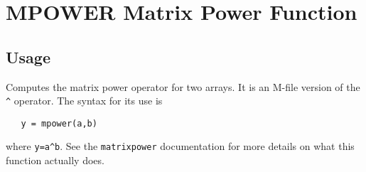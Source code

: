 \section{MPOWER Matrix Power Function}

\subsection{Usage}

Computes the matrix power operator for two arrays.  It is an
M-file version of the \verb|^| operator.  The syntax for its use is
\begin{verbatim}
   y = mpower(a,b)
\end{verbatim}
where \verb|y=a^b|.  See the \verb|matrixpower| documentation for more
details on what this function actually does.
